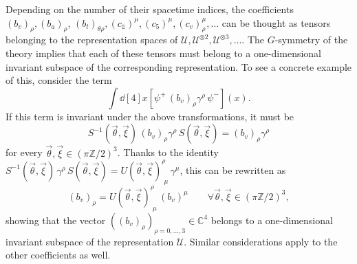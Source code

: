 \documentclass[a4paper, 11pt]{article}
\newcommand{\Z}{\mathbb{Z}}									%
\newcommand{\C}{\mathbb{C}}
\newcommand{\id}{\mathds{1}}								%
\theoremstyle{thm}
\begin{document}
Depending on the number of their spacetime indices, the coefficients $(b_v)_\rho, (b_a)_\rho$, $(b_t)_{\theta \rho}, (c_\id)^\mu, (c_5)^\mu, (c_v)_\rho^\mu, \dots$ can be thought as tensors belonging to the representation spaces of $\mathcal{U}, \mathcal{U}^{\otimes 2}, \mathcal{U}^{\otimes 3}, \dots$. The $G$-symmetry of the theory implies that each of these tensors must belong to a one-dimensional invariant subspace of the corresponding representation. To see a concrete example of this, consider the term
\begin{equation}
\int \dd[4]{x} [\psi^+ \, (b_v)_\rho \gamma^\rho \, \psi^-](x).
\end{equation} 
If this term is invariant under the above transformations, it must be
\begin{equation}
S^{-1}(\vec{\theta}, \vec{\xi}) \, (b_v)_\rho \gamma^\rho \, S(\vec{\theta}, \vec{\xi}) = (b_v)_\rho \gamma^\rho
\end{equation}
for every $\vec{\theta}, \vec{\xi} \in (\pi\Z/2)^3$. Thanks to the identity $S^{-1}(\vec{\theta}, \vec{\xi}) \, \gamma^\rho \, S(\vec{\theta}, \vec{\xi}) = U(\vec{\theta}, \vec{\xi})^{\rho}_{\,\, \mu} \, \gamma^\mu$, this can be rewritten as
\begin{equation}
(b_v)_\rho = U(\vec{\theta}, \vec{\xi})^{\rho}_{\,\, \mu} \, (b_v)^\mu \qquad \forall \vec{\theta}, \vec{\xi} \in (\pi\Z/2)^3,
\end{equation}
showing that the vector $((b_v)_\rho)_{\rho = 0, \dots, 3} \in \C^4$ belongs to a one-dimensional invariant subspace of the representation $\mathcal{U}$. Similar considerations apply to the other coefficients as well.
\end{document}
